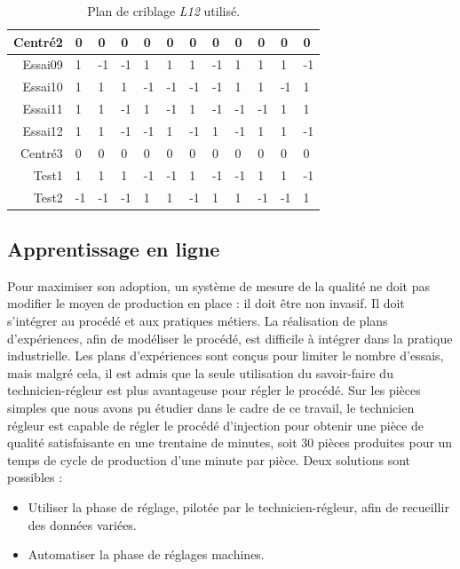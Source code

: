 \begin{table}[tbp]
\begin{tabular}{m|m|m|m|m|m|m|m|m|m|m|m|}
        \multicolumn{1}{|r|}{Centré2} & 0      & 0       & 0      & 0      & 0     & 0     & 0     & 0      & 0     & 0      & 0     \\ \hline
        \multicolumn{1}{|r|}{Essai09} & 1      & -1      & -1     & 1      & 1     & 1     & -1    & 1      & 1     & 1      & -1    \\ \hline
        \multicolumn{1}{|r|}{Essai10} & 1      & 1       & 1      & -1     & -1    & -1    & -1    & 1      & 1     & -1     & 1     \\ \hline
        \multicolumn{1}{|r|}{Essai11} & 1      & 1       & -1     & 1      & -1    & 1     & -1    & -1     & -1    & 1      & 1     \\ \hline
        \multicolumn{1}{|r|}{Essai12} & 1      & 1       & -1     & -1     & 1     & -1    & 1     & -1     & 1     & 1      & -1    \\ \hline
        \multicolumn{1}{|r|}{Centré3} & 0      & 0       & 0      & 0      & 0     & 0     & 0     & 0      & 0     & 0      & 0     \\ \hline
        \multicolumn{1}{|r|}{Test1}   & 1      & 1       & 1      & -1     & -1    & 1     & -1    & -1     & 1     & 1      & -1    \\ \hline
        \multicolumn{1}{|r|}{Test2}   & -1     & -1      & -1     & 1      & 1     & -1    & 1     & 1      & -1    & -1     & 1     \\ \hline
    \end{tabular}
    \caption{Plan de criblage \textit{L12} utilisé.}
    \label{tab:doe_screening}
\end{table}

\subsection{Apprentissage en ligne}
Pour maximiser son adoption, un système de mesure de la qualité ne doit pas modifier le moyen de production en place : il doit être non invasif.
Il doit s'intégrer au procédé et aux pratiques métiers. La réalisation de plans d'expériences, afin de modéliser le procédé, est difficile à intégrer dans la pratique industrielle.
Les plans d'expériences sont conçus pour limiter le nombre d'essais, mais malgré cela, il est admis que la seule utilisation du savoir-faire du technicien-régleur est plus avantageuse pour régler le procédé.
Sur les pièces simples que nous avons pu étudier dans le cadre de ce travail, le technicien régleur est capable de régler le procédé d'injection pour obtenir une pièce de qualité satisfaisante en une trentaine de minutes, soit 30 pièces produites pour un temps de cycle de production d'une minute par pièce.
Deux solutions sont possibles :
\begin{itemize}
    \item Utiliser la phase de réglage, pilotée par le technicien-régleur, afin de recueillir des données variées.
    \item Automatiser la phase de réglages machines.
\end{itemize}

